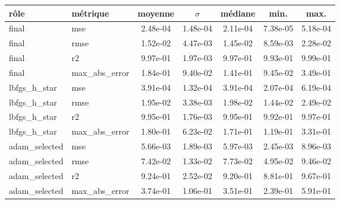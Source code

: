 \begin{tabular}{l l S[table-format=1.2e-2] S[table-format=1.2e-2] S[table-format=1.2e-2] S[table-format=1.2e-2] S[table-format=1.2e-2]}
\toprule
{r\^ole} & {m\'etrique} & {moyenne} & {\(\sigma\)} & {m\'ediane} & {min.} & {max.} \\
\midrule
final & mse & 2.48e-04 & 1.48e-04 & 2.11e-04 & 7.38e-05 & 5.18e-04 \\
final & rmse & 1.52e-02 & 4.47e-03 & 1.45e-02 & 8.59e-03 & 2.28e-02 \\
final & r2 & 9.97e-01 & 1.97e-03 & 9.97e-01 & 9.93e-01 & 9.99e-01 \\
final & max\_abs\_error & 1.84e-01 & 9.40e-02 & 1.41e-01 & 9.45e-02 & 3.49e-01 \\
lbfgs\_h\_star & mse & 3.91e-04 & 1.32e-04 & 3.91e-04 & 2.07e-04 & 6.19e-04 \\
lbfgs\_h\_star & rmse & 1.95e-02 & 3.38e-03 & 1.98e-02 & 1.44e-02 & 2.49e-02 \\
lbfgs\_h\_star & r2 & 9.95e-01 & 1.76e-03 & 9.95e-01 & 9.92e-01 & 9.97e-01 \\
lbfgs\_h\_star & max\_abs\_error & 1.80e-01 & 6.23e-02 & 1.71e-01 & 1.19e-01 & 3.31e-01 \\
adam\_selected & mse & 5.66e-03 & 1.89e-03 & 5.97e-03 & 2.45e-03 & 8.96e-03 \\
adam\_selected & rmse & 7.42e-02 & 1.33e-02 & 7.73e-02 & 4.95e-02 & 9.46e-02 \\
adam\_selected & r2 & 9.24e-01 & 2.52e-02 & 9.20e-01 & 8.81e-01 & 9.67e-01 \\
adam\_selected & max\_abs\_error & 3.74e-01 & 1.06e-01 & 3.51e-01 & 2.39e-01 & 5.91e-01 \\
\bottomrule
\end{tabular}
